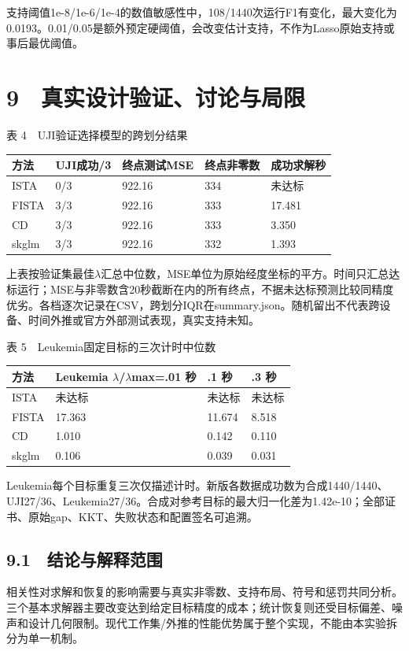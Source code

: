 \documentclass[UTF8,fontset=fandol,10pt]{ctexart}
\begin{document}
支持阈值1e-8/1e-6/1e-4的数值敏感性中，108/1440次运行F1有变化，最大变化为0.0193。0.01/0.05是额外预定硬阈值，会改变估计支持，不作为Lasso原始支持或事后最优阈值。

\clearpage
\section*{9　真实设计验证、讨论与局限}
\begin{center}{\small 表 4　UJI验证选择模型的跨划分结果}\\\small\begin{tabularx}{\linewidth}{lXXXX}
\toprule
方法 & UJI成功/3 & 终点测试MSE & 终点非零数 & 成功求解秒 \\ \midrule
ISTA & 0/3 & 922.16 & 334 & 未达标 \\
FISTA & 3/3 & 922.16 & 333 & 17.481 \\
CD & 3/3 & 922.16 & 333 & 3.350 \\
skglm & 3/3 & 922.16 & 332 & 1.393 \\
\bottomrule\end{tabularx}\end{center}
上表按验证集最佳\ensuremath{\lambda}汇总中位数，MSE单位为原始经度坐标的平方。时间只汇总达标运行；MSE与非零数含20秒截断在内的所有终点，不据未达标预测比较同精度优劣。各档逐次记录在CSV，跨划分IQR在summary.json。随机留出不代表跨设备、时间外推或官方外部测试表现，真实支持未知。

\begin{center}{\small 表 5　Leukemia固定目标的三次计时中位数}\\\small\begin{tabularx}{\linewidth}{lXXX}
\toprule
方法 & Leukemia \ensuremath{\lambda}/\ensuremath{\lambda}max=.01 秒 & .1 秒 & .3 秒 \\ \midrule
ISTA & 未达标 & 未达标 & 未达标 \\
FISTA & 17.363 & 11.674 & 8.518 \\
CD & 1.010 & 0.142 & 0.110 \\
skglm & 0.106 & 0.039 & 0.031 \\
\bottomrule\end{tabularx}\end{center}
Leukemia每个目标重复三次仅描述计时。新版各数据成功数为合成1440/1440、UJI27/36、Leukemia27/36。合成对参考目标的最大归一化差为1.42e-10；全部证书、原始gap、KKT、失败状态和配置签名可追溯。

\subsection*{9.1　结论与解释范围}
相关性对求解和恢复的影响需要与真实非零数、支持布局、符号和惩罚共同分析。三个基本求解器主要改变达到给定目标精度的成本；统计恢复则还受目标偏差、噪声和设计几何限制。现代工作集/外推的性能优势属于整个实现，不能由本实验拆分为单一机制。
\end{document}

